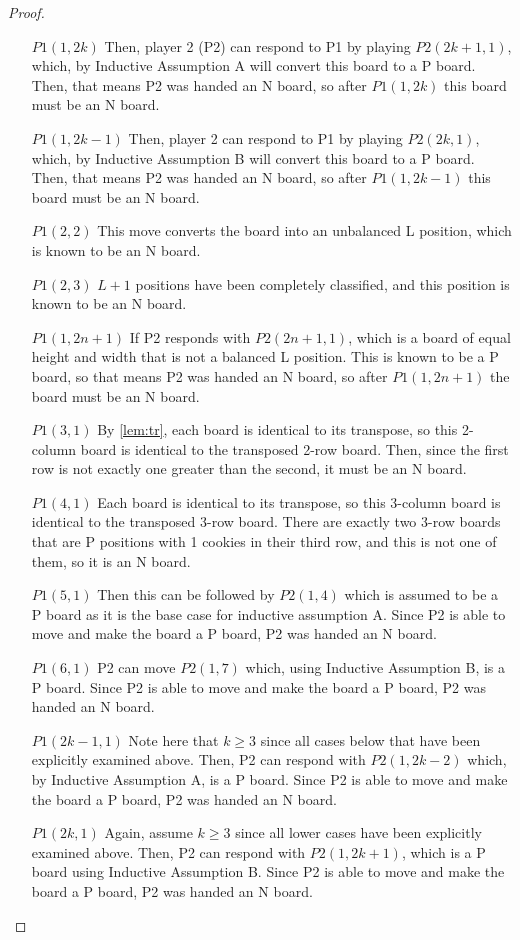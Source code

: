 \documentclass{amsart}
\theoremstyle{definition}
\theoremstyle{remark}
\numberwithin{equation}{section}
\begin{document}
\begin{proof}
\begin{itemize}
	\item [$P1(1, 2k)$] Then, player 2 (P2) can respond to P1 by playing $P2(2k+1,1)$, which, by Inductive Assumption A will convert this board to a P board.  Then, that means P2 was handed an N board, so after $P1(1,2k)$ this board must be an N board.
	\item [$P1(1, 2k-1)$] Then, player 2 can respond to P1 by playing $P2(2k,1)$, which, by Inductive Assumption B will convert this board to a P board.  Then, that means P2 was handed an N board, so after $P1(1,2k-1)$ this board must be an N board.
	\item [$P1(2,2)$] This move converts the board into an unbalanced L position, which is known to be an N board.
	\item [$P1(2, 3)$] $L+1$ positions have been completely classified, and this position is known to be an N board.
	\item [$P1(1, 2n+1)$] If P2 responds with $P2(2n+1, 1)$, which is a board of equal height and width that is not a balanced L position.  This is known to be a P board, so that means P2 was handed an N board, so after $P1(1, 2n+1)$ the board must be an N board.
	\item [$P1(3, 1)$] By \ref{lem:tr}, each board is identical to its transpose, so this 2-column board is identical to the transposed 2-row board.  Then, since the first row is not exactly one greater than the second, it must be an N board.
	\item[$P1(4,1)$] Each board is identical to its transpose, so this 3-column board is identical to the transposed 3-row board.  There are exactly two 3-row boards that are P positions with 1 cookies in their third row, and this is not one of them, so it is an N board.
	\item[$P1(5, 1)$] Then this can be followed by $P2(1,4)$ which is assumed to be a P board as it is the base case for inductive assumption A.  Since P2 is able to move and make the board a P board, P2 was handed an N board.
	\item [$P1(6,1)$] P2 can move $P2(1,7)$ which, using Inductive Assumption B, is a P board.  Since P2 is able to move and make the board a P board, P2 was handed an N board.
	\item [$P1(2k-1, 1)$] Note here that $k\geq 3$ since all cases below that have been explicitly examined above.  Then, P2 can respond with $P2(1, 2k-2)$ which, by Inductive Assumption A, is a P board.  Since P2 is able to move and make the board a P board, P2 was handed an N board.
	\item [$P1(2k, 1)$] Again, assume $k\geq 3$ since all lower cases have been explicitly examined above.  Then, P2 can respond with $P2(1,2k+1)$, which is a P board using Inductive Assumption B.  Since P2 is able to move and make the board a P board, P2 was handed an N board.

\end{itemize}
\end{proof}
\end{document}
